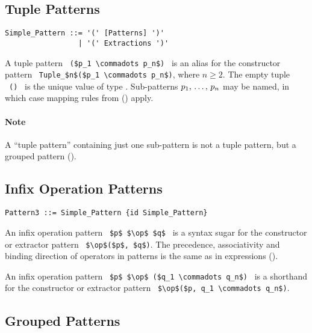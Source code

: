 \subsection{Tuple Patterns}
\label{sec:tuple-patterns}

\syntax\begin{lstlisting}
Simple_Pattern ::= '(' [Patterns] ')'
                 | '(' Extractions ')'
\end{lstlisting}

A tuple pattern ~\lstinline!($p_1 \commadots p_n$)!~ is an alias for the constructor pattern ~\lstinline!Tuple_$n$($p_1 \commadots p_n$)!, where $n \geq 2$. The empty tuple ~\lstinline!()!~ is the unique value of type . Sub-patterns $p_1 ,\, \ldots ,\, p_n$ may be named, in which case mapping rules from () apply. 

\paragraph{Note}
A ``tuple pattern'' containing just one sub-pattern is not a tuple pattern, but a grouped pattern ().





\subsection{Infix Operation Patterns}
\label{sec:infix-operation-patterns}

\syntax\begin{lstlisting}
Pattern3 ::= Simple_Pattern {id Simple_Pattern}
\end{lstlisting}

An infix operation pattern ~\lstinline!$p$ $\op$ $q$!~ is a syntax sugar for the constructor or extractor pattern ~\lstinline!$\op$($p$, $q$)!. The precedence, associativity and binding direction of operators in patterns is the same as in expressions ().

An infix operation pattern ~\lstinline!$p$ $\op$ ($q_1 \commadots q_n$)!~ is a shorthand for the constructor or extractor pattern ~\lstinline!$\op$($p, q_1 \commadots q_n$)!.





\subsection{Grouped Patterns}
\label{sec:grouped-patterns}

